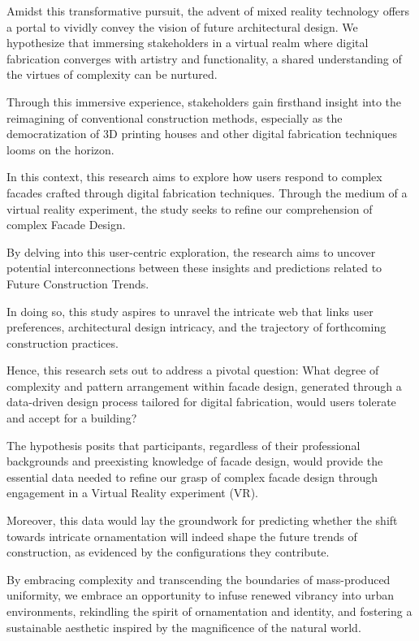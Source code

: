 Amidst this transformative pursuit, the advent of mixed reality technology offers a portal to vividly convey the vision of future architectural design.
We hypothesize that immersing stakeholders in a virtual realm where digital fabrication converges with artistry and functionality, a shared understanding of the virtues of complexity can be nurtured.

Through this immersive experience, stakeholders gain firsthand insight into the reimagining of conventional construction methods, especially as the democratization of 3D printing houses and other digital fabrication techniques looms on the horizon.

In this context, this research aims to explore  how users respond to complex facades crafted through  digital fabrication techniques.
Through the medium of a virtual reality experiment, the study seeks to refine our comprehension of complex Facade Design.

By delving into this user-centric exploration,  the research aims to uncover potential interconnections between these insights and predictions related to Future Construction Trends.

In doing so, this study aspires to unravel the intricate web that links user preferences, architectural design intricacy, and the trajectory of forthcoming construction practices.

Hence, this research sets out to address a pivotal question: What degree of complexity and pattern arrangement within facade design, generated through a data-driven design process tailored for digital fabrication, would users tolerate and accept for a building?

The hypothesis posits that participants, regardless of their professional backgrounds and preexisting knowledge of facade design, would provide the essential data needed to refine our grasp of complex facade design through engagement in a Virtual Reality experiment (VR).

Moreover, this data would lay the groundwork for predicting whether the shift towards intricate ornamentation will indeed shape the future trends of construction, as evidenced by the configurations they contribute.

By embracing complexity and transcending the boundaries of mass-produced uniformity, we embrace an opportunity to infuse renewed vibrancy into urban environments, rekindling the spirit of ornamentation and identity, and fostering a sustainable aesthetic inspired by the magnificence of the natural world.


